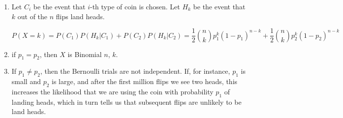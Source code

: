 \begin{enumerate}[label=(\alph*)]
\item Let $C_{i}$ be the event that $i$-th type of coin is chosen. Let $H_{k}$
be the event that $k$ out of the $n$ flips land heads.

$$P(X = k) = P(C_{1})P(H_{k}|C_{1}) + P(C_{2})P(H_{k}|C_{2}) = \frac{1}{2}
\binom{n}{k}p_{1}^{k}(1-p_{1})^{n-k}+ \frac{1}{2}
\binom{n}{k}p_{2}^{k}(1-p_{2})^{n-k}$$

\item if $p_{1} = p_{2}$, then $X$ is Binomial $n$, $k$.

\item If $p_{1} \neq p_{2}$, then the Bernoulli trials are not independent. If,
for instance, $p_{1}$ is small and $p_{2}$ is large, and after the first
million flips we see two heads, this increases the likelihood that we are using
the coin with probability $p_{1}$ of landing heads, which in turn tells us that 
subsequent flips are unlikely to be land heads.

\end{enumerate}